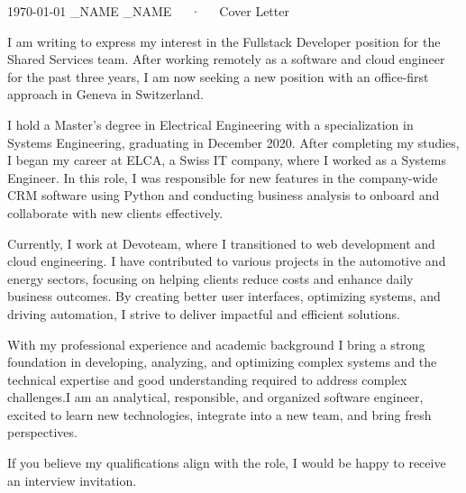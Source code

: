 \documentclass[11pt, a4paper]{awesome-cv}
\begin{document}
\makecvheader[R]

\makecvfooter
  {\today}
  {\FIRST_NAME \LAST_NAME~~~·~~~Cover Letter}
  {}

\makelettertitle

\begin{cvletter}

I am writing to express my interest in the  Fullstack Developer position for the Shared Services team. After working remotely as a software and cloud engineer for the past three years, I am now seeking a new position with an office-first approach in Geneva in Switzerland.

I hold a Master’s degree in Electrical Engineering with a specialization in Systems Engineering, graduating in December 2020. After completing my studies, I began my career at ELCA, a Swiss IT company, where I worked as a Systems Engineer. In this role, I was responsible for new features in the company-wide CRM software using Python and conducting business analysis to onboard and collaborate with new clients effectively.

Currently, I work at Devoteam, where I transitioned to web development and cloud engineering. I have contributed to various projects in the automotive and energy sectors, focusing on helping clients reduce costs and enhance daily business outcomes. By creating better user interfaces, optimizing systems, and driving automation, I strive to deliver impactful and efficient solutions.


With my professional experience and academic background I bring a strong foundation in developing, analyzing, and optimizing complex systems and the technical expertise and good understanding required to address complex challenges.I am an analytical, responsible, and organized software engineer, excited to learn new technologies, integrate into a new team, and bring fresh perspectives.

If you believe my qualifications align with the role, I would be happy to receive an interview invitation.

\end{cvletter}


\makeletterclosing
\end{document}
